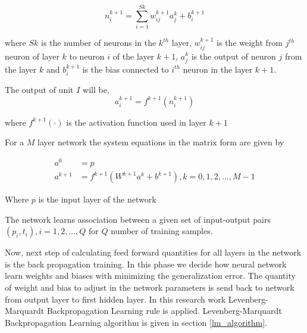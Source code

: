 \documentclass[12pt,a4paper,oneside]{article}
\numberwithin{equation}{section}
\numberwithin{algorithm}{section}
\begin{document}
	
	\begin{equation}
	n^{k+1}_i=\sum\limits_{i=1}^{Sk}w^{k+1}_{ij}a^{k}_{j}+b^{k+1}_i
	\end{equation}\label{equation_feed_forward_input_to_k_layer}
	
	where $Sk$ is the number of neurons in the $k^{th}$ layer, $w^{k+1}_{ij}$ is the weight from $j^{th}$ neuron of layer $k$ to neuron $i$ of the layer $k+1$, $a^{k}_{j}$ is the output of neuron $j$ from the layer $k$ and $b^{k+1}_{i}$ is the bias connected to $i^{th}$ neuron in the layer $k+1$.
	
	The output of unit $I$ will be,
	\begin{equation}
	a^{k+1}_{i}=f^{k+1}(n^{k+1}_{i})
	\end{equation}\label{equation_feed_forward_output_from_k_layer}
	
	where $f^{k+1}(\cdot)$ is the activation function used in layer $k+1$
	
	For a $M$ layer network the system equations in the matrix form are given by
	
	\begin{align}\label{equation_feed_forward_step_in_matrix}
	a^{0}&=p\\
	a^{k+1}&= f^{k+1}(W^{k+1}a^k+b^{k+1}), k=0,1,2,...,M-1
	\end{align}
	
	Where $p$ is the input layer of the network
	
	The network learns association between a given set of input-output pairs ${(p_i,t_i), i=1,2,...,Q}$ for $Q$ number of training samples.
	
	
	
	Now, next step of calculating feed forward quantities for all layers in the network is the back propagation training. In this phase we decide how neural network learn weights and biases with minimizing the generalization error. The quantity of weight and bias to adjust in the network parameters is send back to network from output layer to first hidden layer. In this research work Levenberg-Marquardt Backpropagation Learning rule is applied. Levenberg-Marquardt Backpropagation Learning algorithm is given in section \ref{lm_algorithm}.
	
\end{document}
